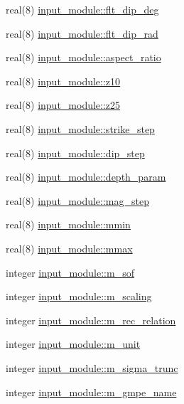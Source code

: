 \begin{DoxyCompactItemize}
real(8) \hyperlink{namespaceinput__module_aab1c202e5a9b8804c86cf645932291d6}{input\+\_\+module\+::flt\+\_\+dip\+\_\+deg}
\item 
real(8) \hyperlink{namespaceinput__module_a00a633afb5b4d59fbb59372da1b72dd5}{input\+\_\+module\+::flt\+\_\+dip\+\_\+rad}
\item 
real(8) \hyperlink{namespaceinput__module_ab4d6a4549b55a71a3451143893707ad2}{input\+\_\+module\+::aspect\+\_\+ratio}
\item 
real(8) \hyperlink{namespaceinput__module_aa9efcd8b3636531d8be863c73c607ba7}{input\+\_\+module\+::z10}
\item 
real(8) \hyperlink{namespaceinput__module_a397fb4f34e05ebd010c3a545e29b8eb3}{input\+\_\+module\+::z25}
\item 
real(8) \hyperlink{namespaceinput__module_aec362b5183a78823c9fd5604388f725e}{input\+\_\+module\+::strike\+\_\+step}
\item 
real(8) \hyperlink{namespaceinput__module_a88d165b66edaf4e0dc9efbc76d5334b3}{input\+\_\+module\+::dip\+\_\+step}
\item 
real(8) \hyperlink{namespaceinput__module_af24dc133394110c4b8722a650aa7aab5}{input\+\_\+module\+::depth\+\_\+param}
\item 
real(8) \hyperlink{namespaceinput__module_a5f4a6ebb1c94126c9810b316e17976e2}{input\+\_\+module\+::mag\+\_\+step}
\item 
real(8) \hyperlink{namespaceinput__module_a6f6194544ef970071393414d02104a8f}{input\+\_\+module\+::mmin}
\item 
real(8) \hyperlink{namespaceinput__module_a41ea519c5d8ed0def5faaee53d32171e}{input\+\_\+module\+::mmax}
\item 
integer \hyperlink{namespaceinput__module_afb3ee34150e00c5c18dddd5db73c0b9f}{input\+\_\+module\+::m\+\_\+sof}
\item 
integer \hyperlink{namespaceinput__module_ac8f94aead42fc3c3c63f6b80156c4392}{input\+\_\+module\+::m\+\_\+scaling}
\item 
integer \hyperlink{namespaceinput__module_acb06b69e7ed3cec59c693ab700ae7bc7}{input\+\_\+module\+::m\+\_\+rec\+\_\+relation}
\item 
integer \hyperlink{namespaceinput__module_a1a7790113ec65bfe00fa926b09b6a451}{input\+\_\+module\+::m\+\_\+unit}
\item 
integer \hyperlink{namespaceinput__module_a418d22665630502982d2925663df35cc}{input\+\_\+module\+::m\+\_\+sigma\+\_\+trunc}
\item 
integer \hyperlink{namespaceinput__module_a2426a45f38ebf777bbda4d215a04a11a}{input\+\_\+module\+::m\+\_\+gmpe\+\_\+name}

\end{DoxyCompactItemize}
